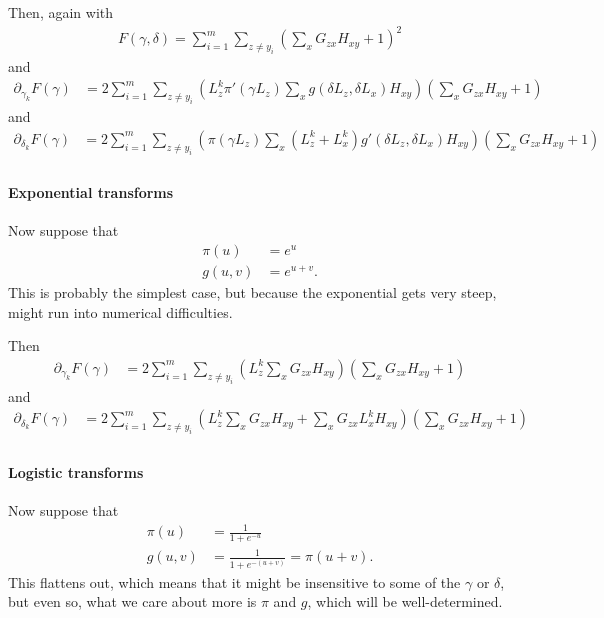 \documentclass{article}
\begin{document}
Then, again with
\begin{align}
  F(\gamma,\delta) = \sum_{i=1}^m \sum_{z \neq y_i} \left( \sum_x G_{zx} H_{xy} + 1 \right)^2 
\end{align}
and
\begin{align}
  \partial_{\gamma_k} F(\gamma) &= 2 \sum_{i=1}^m \sum_{z \neq y_i} \left( L^k_z \pi'(\gamma L_z) \sum_x g(\delta L_z, \delta L_x) H_{xy}\right) \left( \sum_x G_{zx} H_{xy} + 1 \right)  
\end{align}
and
\begin{align}
  \partial_{\delta_k} F(\gamma) &= 2 \sum_{i=1}^m \sum_{z \neq y_i} \left( \pi(\gamma L_z) \sum_x (L^k_z + L^k_x) g'(\delta L_z, \delta L_x) H_{xy}\right) \left( \sum_x G_{zx} H_{xy} + 1 \right)  \\
\end{align}


\paragraph{Exponential transforms}

Now suppose that
\begin{align}
  \pi(u) &= e^{u} \\
  g(u,v) &= e^{u+v} .
\end{align}
This is probably the simplest case, but because the exponential gets very steep,
might run into numerical difficulties.

Then
\begin{align}
  \partial_{\gamma_k} F(\gamma) &= 
    2 \sum_{i=1}^m \sum_{z \neq y_i} 
    \left( L^k_z \sum_x G_{zx} H_{xy}\right) 
    \left( \sum_x G_{zx} H_{xy} + 1 \right)  
\end{align}
and
\begin{align}
  \partial_{\delta_k} F(\gamma) &= 
    2 \sum_{i=1}^m \sum_{z \neq y_i} 
    \left( L^k_z \sum_x G_{zx} H_{xy}
      + \sum_x G_{zx} L^k_x H_{xy}\right) 
    \left( \sum_x G_{zx} H_{xy} + 1 \right)  \\
\end{align}


\paragraph{Logistic transforms}

Now suppose that
\begin{align}
  \pi(u) &= \frac{1}{1+e^{-u}}  \\
  g(u,v) &= \frac{1}{1+e^{-(u+v)}} = \pi(u+v) .
\end{align}
This flattens out, which means that it might be insensitive to some of the $\gamma$ or $\delta$,
but even so, what we care about more is $\pi$ and $g$, which will be well-determined.
\end{document}
